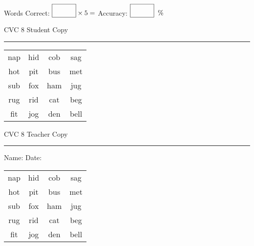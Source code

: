 \documentclass{memoir}
\begin{document}
\small

Words Correct: $\fbox{\phantom{\huge 100}} \times 5 = $ Accuracy: $\fbox{\phantom{\huge 100}}\;\; \%$ 

\vfill

\newpage


\footnotesize \noindent
CVC 8 \hfill Student Copy
\smallskip
\hrule

\Large

\setlength{\tabcolsep}{14pt}
\def\arraystretch{2}

{\selectfont


\begin{vplace}[0.5]
\begin{center}
\begin{tabular}{cccc}
nap & hid & cob & sag \\
hot & pit & bus & met \\
sub & fox & ham & jug \\
rug & rid & cat & beg \\
fit & jog & den & bell \\
\end{tabular}
\end{center}
\end{vplace}

}

\newpage

\footnotesize \noindent
CVC 8 \hfill Teacher Copy
\smallskip
\hrule

\small

\vfill

\noindent
Name: \underline{\hspace{1.75in}} \hfill Date: \underline{\hspace{1in}}

\Large

{\selectfont


\begin{vplace}[0.5]
\begin{center}
\begin{tabular}{cccc}
nap & hid & cob & sag \\
hot & pit & bus & met \\
sub & fox & ham & jug \\
rug & rid & cat & beg \\
fit & jog & den & bell \\
\end{tabular}
\end{center}
\end{vplace}



}
\end{document}

